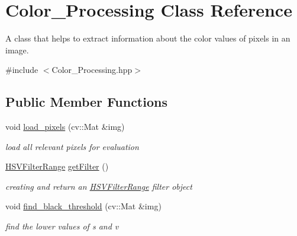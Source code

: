 \hypertarget{class_color___processing}{}\section{Color\+\_\+\+Processing Class Reference}
\label{class_color___processing}


A class that helps to extract information about the color values of pixels in an image.  




{\ttfamily \#include $<$Color\+\_\+\+Processing.\+hpp$>$}

\subsection*{Public Member Functions}
\begin{DoxyCompactItemize}
\item 
\mbox{\label{class_color___processing_a293f699a508b29f6a040f80363b5175c}} 
void \mbox{\hyperlink{class_color___processing_a293f699a508b29f6a040f80363b5175c}{load\+\_\+pixels}} (cv\+::\+Mat \&img)
\begin{DoxyCompactList}\small\item\em load all relevant pixels for evaluation \end{DoxyCompactList}\item 
\mbox{\label{class_color___processing_a1b6c44ee9495d9d453545b57640be8cd}} 
\mbox{\hyperlink{struct_h_s_v_filter_range}{H\+S\+V\+Filter\+Range}} \mbox{\hyperlink{class_color___processing_a1b6c44ee9495d9d453545b57640be8cd}{get\+Filter}} ()
\begin{DoxyCompactList}\small\item\em creating and return an \mbox{\hyperlink{struct_h_s_v_filter_range}{H\+S\+V\+Filter\+Range}} filter object \end{DoxyCompactList}\item 
\mbox{\label{class_color___processing_aff93a009843ca7762732984ef57375b9}} 
void \mbox{\hyperlink{class_color___processing_aff93a009843ca7762732984ef57375b9}{find\+\_\+black\+\_\+threshold}} (cv\+::\+Mat \&img)
\begin{DoxyCompactList}\small\item\em find the lower values of s and v \end{DoxyCompactList}\item 

\end{DoxyCompactItemize}
